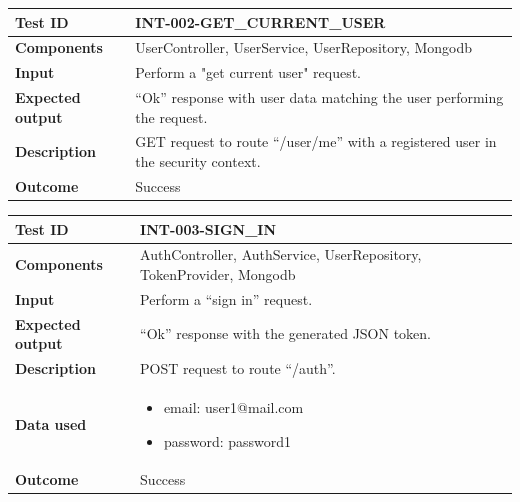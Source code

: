 \begin{table}[H]
    \centering
    \begin{tabular}{p{3cm}p{10cm}}
    \textbf{Test ID} & INT-002-GET\_CURRENT\_USER \\ \hline
    \textbf{Components} & UserController, UserService, UserRepository, Mongodb
    \\ \hline
    \textbf{Input} & Perform a "get current user" request. \\ \hline
    \textbf{Expected output} & “Ok” response with user data matching the user performing the request. \\ \hline
    \textbf{Description} & GET request to route “/user/me” with a registered user in the security context. \\ \hline
    \textbf{Outcome} & Success \\ \hline
    \end{tabular}
\end{table}

\begin{table}[H]
    \centering
    \begin{tabular}{p{3cm}p{10cm}}
    \textbf{Test ID} & INT-003-SIGN\_IN \\ \hline
    \textbf{Components} & AuthController, AuthService, UserRepository, TokenProvider, Mongodb \\ \hline
    \textbf{Input} & Perform a “sign in” request. \\ \hline
    \textbf{Expected output} & “Ok” response with the generated JSON token. \\ \hline
    \textbf{Description} & POST request to route “/auth”. \\ \hline
    \textbf{Data used} & 
        \begin{itemize}[label={}] \itemsep0em
            \item email: user1@mail.com
            \item password: password1
        \end{itemize} \\ \hline
    \textbf{Outcome} & Success \\ \hline
    \end{tabular}
\end{table}

